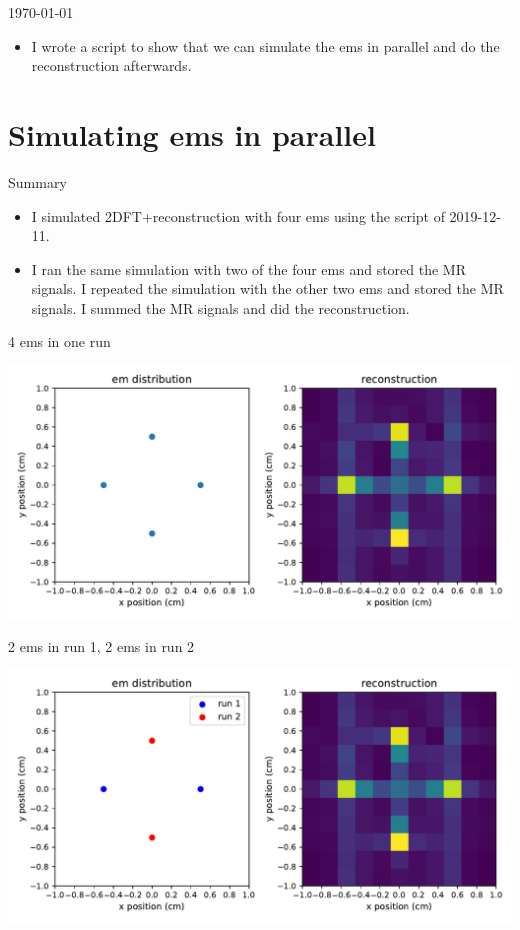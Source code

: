 \documentclass[dvipsnames]{beamer}
\begin{document}
\begin{frame}{\today}
\begin{itemize}
\item I wrote a script to show that we can simulate the ems in parallel and do the reconstruction afterwards.
\end{itemize}
\end{frame}

\section{Simulating ems in parallel}

\begin{frame}{Summary}
\begin{itemize}
\item I simulated 2DFT+reconstruction with four ems using the script of 2019-12-11.
\item I ran the same simulation with two of the four ems and stored the MR signals. I repeated the simulation with the other two ems and stored the MR signals. I summed the MR signals and did the reconstruction.
\end{itemize}
\end{frame}

\begin{frame}{4 ems in one run}
\begin{center}
\includegraphics[width=\textwidth]{reconstruction_single}
\end{center}
\end{frame}

\begin{frame}{2 ems in run 1, 2 ems in run 2}
\begin{center}
\includegraphics[width=\textwidth]{reconstruction_parallel}
\end{center}
\end{frame}
\end{document}
